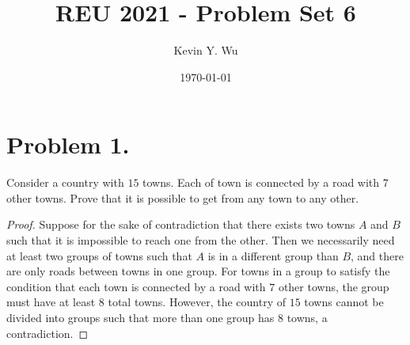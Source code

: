 \documentclass{article}
\title{REU 2021 - Problem Set 6}
\author{Kevin Y. Wu}
\date{\today}
\begin{document}
\maketitle

\tableofcontents
\newpage
{}


\section{Problem 1.}
Consider a country with $15$ towns. Each of town is connected by a road with $7$ other towns. Prove that it is possible to get from any town to any other.
\begin{proof}
Suppose for the sake of contradiction that there exists two towns $A$ and $B$ such that it is impossible to reach one from the other. Then we necessarily need at least two groups of towns such that $A$ is in a different group than $B$, and there are only roads between towns in one group. For towns in a group to satisfy the condition that each town is connected by a road with $7$ other towns, the group must have at least $8$ total towns. However, the country of $15$ towns cannot be divided into groups such that more than one group has $8$ towns, a contradiction.
\end{proof}
\end{document}
